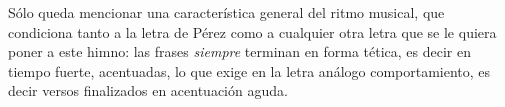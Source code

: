 Sólo queda mencionar una característica general del ritmo musical, que condiciona tanto a la letra de Pérez como a cualquier otra letra que se le quiera poner a este himno: las frases \emph{siempre} terminan en forma tética, es decir en tiempo fuerte, acentuadas, lo que exige en la letra análogo comportamiento, es decir versos finalizados en acentuación aguda.
